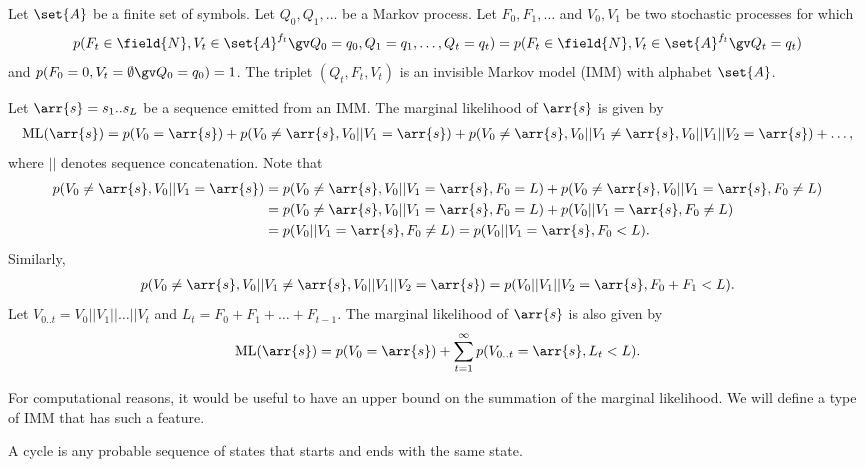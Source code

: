 \begin{definition}
  Let $\set{A}$ be a finite set of symbols.
  Let $Q_0, Q_1, \dots$ be a Markov process.
  Let $F_0, F_1, \dots$ and $V_0, V_1$ be two stochastic processes for which
  \begin{equation*}
    p(F_t\in\field{N}, V_t\in\set{A}^{f_t} \gv Q_0=q_0, Q_1=q_1, \dots, Q_t=q_t)
    = p(F_t\in\field{N}, V_t\in\set{A}^{f_t} \gv Q_t=q_t)
  \end{equation*}
  and $p(F_0=0, V_t=\emptyset \gv Q_0=q_0) = 1$.
  The triplet $(Q_t, F_t, V_t)$ is an invisible Markov model (IMM) with alphabet $\set{A}$.
\end{definition}

Let $\arr{s}=s_1 .. s_L$ be a sequence emitted from an IMM.
The marginal likelihood of $\arr{s}$ is given by
\begin{align}\label{eq:ml}
  \mathrm{ML}(\arr{s}) = p(V_0=\arr{s}) + p(V_0\neq\arr{s}, V_0||V_1=\arr{s}) +
  p(V_0\neq\arr{s}, V_0||V_1\neq\arr{s}, V_0||V_1||V_2=\arr{s}) + \dots,
\end{align}
where $||$ denotes sequence concatenation.
Note that
\begin{align*}
  p(V_0 \neq \arr{s}, V_0||V_1=\arr{s}) &= p(V_0\neq\arr{s}, V_0||V_1=\arr{s}, F_0=L) +
  p(V_0\neq\arr{s}, V_0||V_1=\arr{s}, F_0 \neq L)\\
  &= p(V_0\neq\arr{s}, V_0||V_1=\arr{s}, F_0=L) + p(V_0||V_1=\arr{s}, F_0 \neq L)\\
  &= p(V_0||V_1=\arr{s}, F_0 \neq L) = p(V_0||V_1=\arr{s}, F_0 < L).
\end{align*}
Similarly,
\begin{align*}
  p(V_0\neq\arr{s}, V_0||V_1\neq\arr{s}, V_0||V_1||V_2=\arr{s}) =
  p(V_0||V_1||V_2=\arr{s}, F_0+F_1 < L).
\end{align*}
Let $V_{0..t} = V_0||V_1||\dots||V_t$ and $L_t = F_0 + F_1 + \dots + F_{t-1}$.
The marginal likelihood of $\arr{s}$ is also given by
\begin{align*}
  \mathrm{ML}(\arr{s}) = p(V_0=\arr{s}) + \sum_{t=1}^{\infty} p(V_{0..t}=\arr{s}, L_t<L).
\end{align*}

For computational reasons, it would be useful to have an upper bound on the summation of the
marginal likelihood.
We will define a type of IMM that has such a feature.

\begin{definition}
  A cycle is any probable sequence of states that starts and ends with the same state.
\end{definition}


